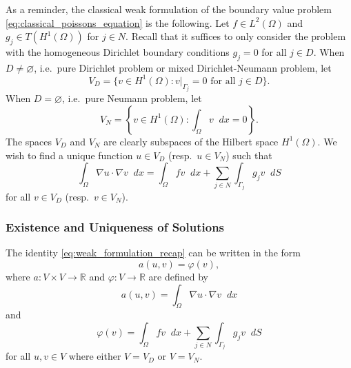 \documentclass[english, 12pt, a4paper, sci, utf8, a-2b, online]{aaltothesis}
\theoremstyle{definition}
\theoremstyle{plain}
\newcommand*\diff{\mathop{}\!d}
\numberwithin{equation}{section}
\begin{document}
As a reminder, the classical weak formulation of the boundary value problem 
\eqref{eq:classical_poissons_equation} is the following.
Let $f \in L^2(\Omega)$ and $g_j \in T(H^1(\Omega))$ for $j \in N$.
Recall that it suffices to only consider
the problem with the homogeneous Dirichlet boundary conditions
$g_j = 0$ for all $j \in D$.
When $D \neq \varnothing$, i.e.\ pure Dirichlet problem or mixed
Dirichlet-Neumann problem, let
\begin{equation}
    \label{eq:VD_test_space}
    V_D = \{ v \in H^1(\Omega)
        : v|_{\Gamma_j} = 0 \text{ for all } j \in D \}.
\end{equation}
When $D = \varnothing$, i.e.\ pure Neumann problem, let
\begin{equation}
    \label{eq:VN_test_space}
    V_N = \left\{ v \in H^1(\Omega) : \int_{\Omega} v \diff x = 0 \right\}.
\end{equation}
The spaces $V_D$ and $V_N$ are clearly subspaces
of the Hilbert space $H^1(\Omega)$.
We wish to find a unique function $u \in V_D$ (resp.\ $u \in V_N$) such that
\begin{equation}
    \label{eq:weak_formulation_recap}
    \int_{\Omega} \nabla u \cdot \nabla v \diff x
    = \int_{\Omega} fv \diff x + \sum_{j \in N} \int_{\Gamma_j} g_j v \diff S
\end{equation}
for all $v \in V_D$ (resp.\ $v \in V_N$).

\subsubsection{Existence and Uniqueness of Solutions}

The identity \eqref{eq:weak_formulation_recap} can be written in the form
\begin{equation}
    \label{eq:abstract_variational_identity}
    a(u,v) = \varphi(v),
\end{equation}
where $a: V \times V \to \mathbb{R}$ and $\varphi: V \to \mathbb{R}$
are defined by
\begin{equation}
    \label{eq:weak_poisson_bilinear_form}
    a(u,v) = \int_{\Omega} \nabla u \cdot \nabla v \diff x
\end{equation}
and
\begin{equation}
    \label{eq:weak_poisson_functional}
    \varphi(v) = \int_{\Omega} fv \diff x
        + \sum_{j \in N} \int_{\Gamma_j} g_j v \diff S
\end{equation}
for all $u,v \in V$ where either $V = V_D$ or $V = V_N$.
\end{document}
